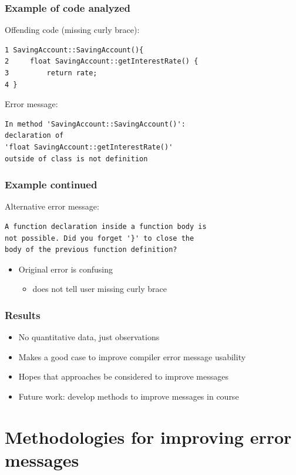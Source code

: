 \documentclass{beamer}
\begin{document}
\begin{frame}[fragile]
	\frametitle{Example of code analyzed}
Offending code (missing curly brace):
\begin{verbatim}
1 SavingAccount::SavingAccount(){
2     float SavingAccount::getInterestRate() {
3    	  return rate;
4 }
\end{verbatim}

Error message:
\begin{verbatim}
In method 'SavingAccount::SavingAccount()':
declaration of 
'float SavingAccount::getInterestRate()'
outside of class is not definition
\end{verbatim}

\end{frame}

\begin{frame}[fragile]
	\frametitle{Example continued}
Alternative error message:
\begin{verbatim}
A function declaration inside a function body is 
not possible. Did you forget '}' to close the 
body of the previous function definition?
\end{verbatim}

\begin{itemize}
	\item Original error is confusing
	\begin{itemize}
		\item does not tell user missing curly brace
	\end{itemize}
\end{itemize}

\end{frame}

\begin{frame}
	\frametitle{Results}
		\begin{itemize}
			\item No quantitative data, just observations
			\item Makes a good case to improve compiler error message usability
			\item Hopes that approaches be considered to improve messages
			\item Future work: develop methods to improve messages in course
		\end{itemize}

\end{frame}

\section[Methodologies]{Methodologies for improving error messages}
\end{document}
